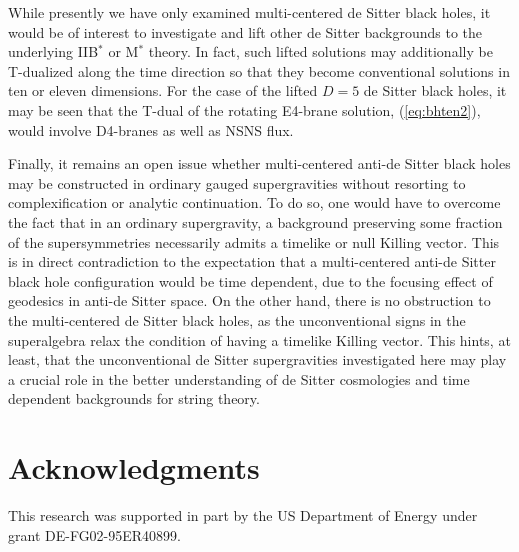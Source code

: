 \documentclass[a4paper,12pt]{article}
\begin{document}
While presently we have only examined multi-centered de Sitter black
holes, it would be of interest to investigate and lift other de Sitter
backgrounds to the underlying IIB$^*$ or M$^*$ theory.  In fact, such
lifted solutions may additionally be T-dualized along the time direction
so that they become conventional solutions in ten or eleven dimensions.
For the case of the lifted $D=5$ de Sitter black holes, it may be seen
that the T-dual of the rotating E4-brane solution, (\ref{eq:bhten2}),
would involve D4-branes as well as NSNS flux.

Finally, it remains an open issue whether multi-centered anti-de Sitter
black holes may be constructed in ordinary gauged supergravities without
resorting to complexification or analytic continuation.  To do so, one
would have to overcome the fact that in an ordinary supergravity, a
background preserving some fraction of the supersymmetries necessarily
admits a timelike or null Killing vector.  This is in direct
contradiction to the expectation that a multi-centered anti-de Sitter
black hole configuration would be time dependent, due to the focusing
effect of geodesics in anti-de Sitter space.  On the other hand, there
is no obstruction to the multi-centered de Sitter black holes, as the
unconventional signs in the superalgebra relax the condition of having a
timelike Killing vector.  This hints, at least, that the unconventional
de Sitter supergravities investigated here may play a crucial role in
the better understanding of de Sitter cosmologies and time dependent
backgrounds for string theory.

\section*{Acknowledgments}

This research was supported in part by the US Department of Energy under
grant DE-FG02-95ER40899.
\end{document}
